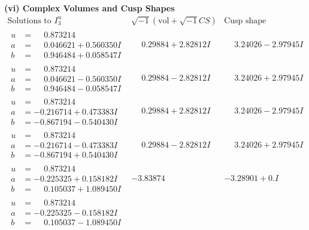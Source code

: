 \documentclass[1p]{elsarticle_modified}
\theoremstyle{definition}
\newcommand{\I}{\sqrt{-1}}
\begin{document}
\newpage\flushleft \textbf{(vi) Complex Volumes and Cusp Shapes}
$$\begin{array}{c|c|c}  
\text{Solutions to }I^u_{3}& \I (\text{vol} + \sqrt{-1}CS) & \text{Cusp shape}\\
 \hline 
\begin{aligned}
u &= \phantom{-}0.873214\phantom{ +0.000000I} \\
a &= \phantom{-}0.046621 + 0.560350 I \\
b &= \phantom{-}0.946484 + 0.058547 I\end{aligned}
 & \phantom{-}0.29884 + 2.82812 I & \phantom{-}3.24026 - 2.97945 I \\ \hline\begin{aligned}
u &= \phantom{-}0.873214\phantom{ +0.000000I} \\
a &= \phantom{-}0.046621 - 0.560350 I \\
b &= \phantom{-}0.946484 - 0.058547 I\end{aligned}
 & \phantom{-}0.29884 - 2.82812 I & \phantom{-}3.24026 + 2.97945 I \\ \hline\begin{aligned}
u &= \phantom{-}0.873214\phantom{ +0.000000I} \\
a &= -0.216714 + 0.473383 I \\
b &= -0.867194 - 0.540430 I\end{aligned}
 & \phantom{-}0.29884 + 2.82812 I & \phantom{-}3.24026 - 2.97945 I \\ \hline\begin{aligned}
u &= \phantom{-}0.873214\phantom{ +0.000000I} \\
a &= -0.216714 - 0.473383 I \\
b &= -0.867194 + 0.540430 I\end{aligned}
 & \phantom{-}0.29884 - 2.82812 I & \phantom{-}3.24026 + 2.97945 I \\ \hline\begin{aligned}
u &= \phantom{-}0.873214\phantom{ +0.000000I} \\
a &= -0.225325 + 0.158182 I \\
b &= \phantom{-}0.105037 + 1.089450 I\end{aligned}
 & -3.83874\phantom{ +0.000000I} & -3.28901 + 0. I\phantom{ +0.000000I} \\ \hline\begin{aligned}
u &= \phantom{-}0.873214\phantom{ +0.000000I} \\
a &= -0.225325 - 0.158182 I \\
b &= \phantom{-}0.105037 - 1.089450 I\end{aligned}

\end{array}$$
\end{document}
